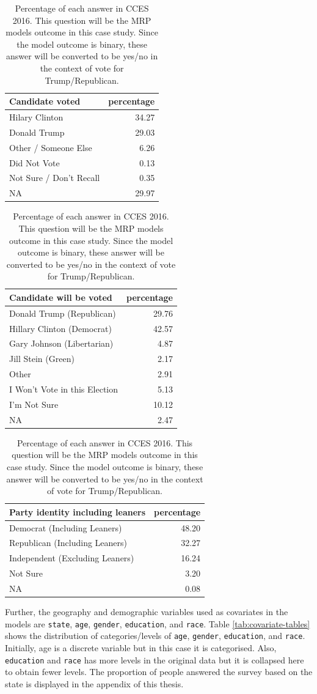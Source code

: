 \documentclass{monashthesis}
\begin{document}
\begin{table}
\caption{\label{tab:outcome-table}Percentage of each answer in CCES 2016. This question will be the MRP models outcome in this case study. Since the model outcome is binary, these answer will be converted to be yes/no in the context of vote for Trump/Republican.}

\centering
\begin{tabular}[t]{lr}
\toprule
Candidate voted & percentage\\
\midrule
Hilary Clinton & 34.27\\
Donald Trump & 29.03\\
Other / Someone Else & 6.26\\
Did Not Vote & 0.13\\
Not Sure / Don't Recall & 0.35\\
\addlinespace
NA & 29.97\\
\bottomrule
\end{tabular}
\centering
\begin{tabular}[t]{lr}
\toprule
Candidate will be voted & percentage\\
\midrule
Donald Trump (Republican) & 29.76\\
Hillary Clinton (Democrat) & 42.57\\
Gary Johnson (Libertarian) & 4.87\\
Jill Stein (Green) & 2.17\\
Other & 2.91\\
\addlinespace
I Won't Vote in this Election & 5.13\\
I'm Not Sure & 10.12\\
NA & 2.47\\
\bottomrule
\end{tabular}
\centering
\begin{tabular}[t]{lr}
\toprule
Party identity including leaners & percentage\\
\midrule
Democrat (Including Leaners) & 48.20\\
Republican (Including Leaners) & 32.27\\
Independent (Excluding Leaners) & 16.24\\
Not Sure & 3.20\\
NA & 0.08\\
\bottomrule
\end{tabular}
\end{table}

Further, the geography and demographic variables used as covariates in the models are \texttt{state}, \texttt{age}, \texttt{gender}, \texttt{education}, and \texttt{race}. Table \ref{tab:covariate-tables} shows the distribution of categories/levels of \texttt{age}, \texttt{gender}, \texttt{education}, and \texttt{race}. Initially, age is a discrete variable but in this case it is categorised. Also, \texttt{education} and \texttt{race} has more levels in the original data but it is collapsed here to obtain fewer levels. The proportion of people answered the survey based on the state is displayed in the appendix of this thesis.
\end{document}
